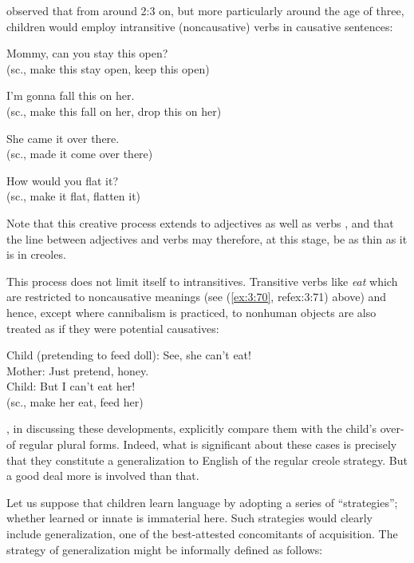
\citet{Bowerman1974} observed that from around 2:3 on, but more particularly around the age of three, children would employ intransitive (noncausative) verbs in causative sentences:

\ea\label{ex:3:77}
Mommy, can you stay this open?\\
\glt (sc., make this stay open, keep this open)
\z

\ea\label{ex:3:78}
I'm gonna fall this on her.\\
\glt (sc., make this fall on her, drop this on her) 
\z

\ea\label{ex:3:79}
She came it over there.\\
\glt (sc., made it come over there)
\z

\ea\label{ex:3:80}
How would you flat it?\\
\glt (sc., make it flat, flatten it)
\z

\noindent Note that this creative process extends to adjectives as well as verbs , and that the line between adjectives and verbs may therefore, at this stage, be as thin as it is in creoles.

This process does not limit itself to intransitives. Transitive verbs like \textit{eat} which are restricted to noncausative meanings (see (\ref{ex:3:70}, ref{ex:3:71}) above) and hence, except where cannibalism is practiced, to nonhuman objects are also treated as if they were potential causatives:

\ea\label{ex:3:81}
Child (pretending to feed doll): See, she can't eat!\\
Mother: Just pretend, honey.\\
Child: But I can't eat her!\\
(sc., make her eat, feed her)
\z

\citet[511]{ClarkEtAl1977}, in discussing these developments, explicitly compare them with the child's over- of regular plural forms. Indeed, what is significant about these cases is precisely that they constitute a generalization to English of the regular creole strategy. \enlargethispage{1\baselineskip}But a good deal more is involved than that.%

Let us suppose that children learn language by adopting a series of ``strategies''; whether learned or innate is immaterial here. Such
strategies would clearly include generalization, one of the best-attested concomitants of acquisition. The strategy of generalization might be informally defined as follows:

